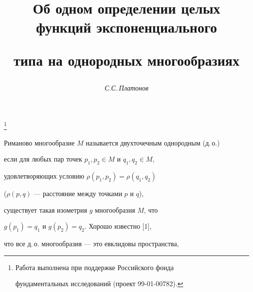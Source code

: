 \setcounter{page}{60}















\author{\it С.С.\,Платонов}




\title{Об одном определении целых функций экспоненциального


типа на однородных многообразиях}


\thanks{Работа выполнена при поддержке Российского фонда


фундаментальных исследований (проект 99-01-00782).}





\date{}




\pagestyle{plain} %







\maketitle


\label{begin}








Риманово многообразие $M$ называется двухточечным однородным (д.\,о.)


если для любых пар точек $p_1, p_2\in M$ и $q_1, q_2\in M$,


удовлетворяющих условию $\rho(p_1,p_2)=\rho(q_1,q_2)$


($\rho(p,q)$ --- расстояние между точками $p$ и $q$),


существует такая изометрия $g$ многообразия $M$, что


$g(p_1)=q_1$ и $g(p_2)=q_2$. Хорошо известно [1],


что все д.\,о. многообразия --- это евклидовы пространства,


